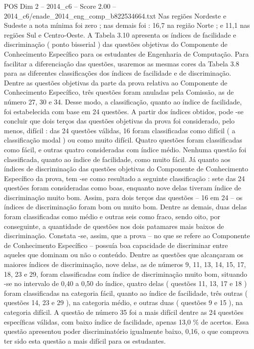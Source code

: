 \begin{textsample}{POS Dim 2 – 2014\_c6 – Score 2.00 – 2014\_c6/enade\_2014\_eng\_comp\_b822534664.txt}
Nas regiões Nordeste e Sudeste a nota mínima foi zero ; nas demais foi : 16,7 na região Norte ; e 11,1 nas regiões Sul e Centro-Oeste.
A Tabela 3.10 apresenta os índices de facilidade e discriminação ( ponto bisserial ) das questões objetivas do Componente de Conhecimento Específico para os estudantes de Engenharia de Computação.
Para facilitar a diferenciação das questões, usaremos as mesmas cores da Tabela 3.8 para as diferentes classificações dos índices de facilidade e de discriminação.
Dentre as questões objetivas da parte da prova relativa ao Componente de Conhecimento Específico, três questões foram anuladas pela Comissão, as de número 27, 30 e 34.
Desse modo, a classificação, quanto ao índice de facilidade, foi estabelecida com base em 24 questões.
A partir dos índices obtidos, pode -se concluir que dois terços das questões objetivas da prova foi considerado, pelo menos, difícil : das 24 questões válidas, 16 foram classificadas como difícil ( a classificação modal ) ou como muito difícil.
Quatro questões foram classificadas como fácil, e outras quatro consideradas com índice médio.
Nenhuma questão foi classificada, quanto ao índice de facilidade, como muito fácil.
Já quanto aos índices de discriminação das questões objetivas do Componente de Conhecimento Específico da prova, tem -se como resultado a seguinte classificação : sete das 24 questões foram consideradas como boas, enquanto nove delas tiveram índice de discriminação muito bom.
Assim, para dois terços das questões – 16 em 24 – os índices de discriminação foram bom ou muito bom.
Dentre as demais, duas delas foram classificadas como médio e outras seis como fraco, sendo oito, por conseguinte, a quantidade de questões nos dois patamares mais baixos de discriminação.
Constata -se, assim, que a prova – no que se refere ao Componente de Conhecimento Específico – possuía boa capacidade de discriminar entre aqueles que dominam ou não o conteúdo.
Dentre as questões que alcançaram os maiores índices de discriminação, nove delas, as de números 9, 11, 13, 14, 15, 17, 18, 23 e 29, foram classificadas com índice de discriminação muito bom, situando -se no intervalo de 0,40 a 0,50 do índice, quatro delas ( questões 11, 13, 17 e 18 ) foram classificadas na categoria fácil, quanto ao índice de facilidade, três outras ( questões 14, 23 e 29 ), na categoria médio, e outras duas ( questões 9 e 15 ), na categoria difícil.
A questão de número 35 foi a mais difícil dentre as 24 questões específicas válidas, com baixo índice de facilidade, apenas 13,0 \% de acertos.
Essa questão apresentou poder discriminatório igualmente baixo, 0,16, o que comprova ter sido esta questão a mais difícil para os estudantes.

\end{textsample}
